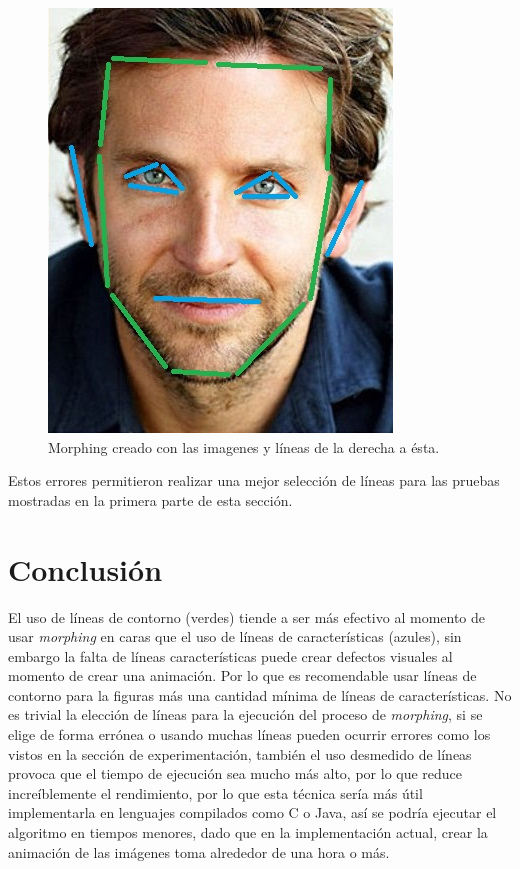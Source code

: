 \documentclass[conference]{IEEEtran}
\begin{document}
\begin{figure}[H]
\begin{multicols}{3}
    \includegraphics[width=0.65\linewidth]{extra/errors/01/2 lines.jpg} \par
   
\end{multicols}
\caption{Morphing creado con las imagenes y líneas de la derecha a ésta.}
\end{figure}	
	
	Estos errores permitieron realizar una mejor selección de líneas para las pruebas mostradas en la primera parte de esta sección.

\section*{Conclusión}
	El uso de líneas de contorno (verdes) tiende a ser más efectivo al momento de usar \textit{morphing} en caras que el uso de líneas de características (azules), sin embargo la falta de líneas características puede  crear defectos visuales al momento de crear una animación. Por lo que es recomendable usar líneas de contorno para la figuras más una cantidad mínima de líneas de características.
	No es trivial la elección de líneas para la ejecución del proceso de \textit{morphing}, si se elige de forma errónea o usando muchas líneas pueden ocurrir errores como los vistos en la sección de experimentación, también el uso desmedido de líneas provoca que el tiempo de ejecución sea mucho más alto, por lo que reduce increíblemente el rendimiento, por lo que esta técnica sería más útil implementarla en lenguajes compilados como C o Java, así se podría ejecutar el algoritmo en tiempos menores, dado que en la implementación actual, crear la animación de las imágenes toma alrededor de una hora o más.
\end{document}
